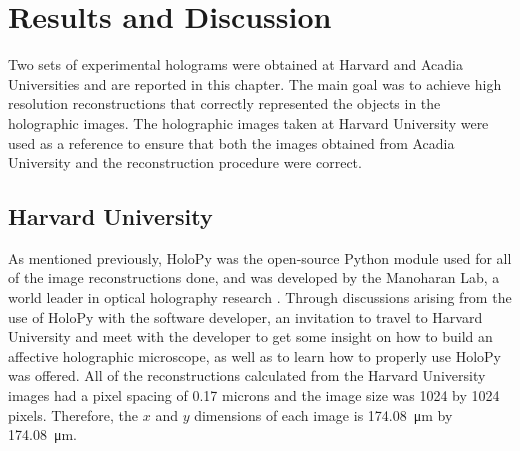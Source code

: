 %
%

\chapter{Results and Discussion} \label{chap:Results}

Two sets of experimental holograms were obtained at Harvard and Acadia
Universities and are reported in this chapter. The main goal was to achieve
high resolution 
reconstructions that correctly represented the objects in the holographic
images.
The holographic images taken at Harvard University were
used as a reference to ensure that both the images obtained from Acadia
University and the reconstruction procedure were correct.

\section{Harvard University}

As mentioned previously, HoloPy was the open-source Python module used for all
of the image reconstructions
done, and was developed by the Manoharan Lab, a world leader in optical
holography research \cite{Manoharan}. 
Through discussions arising from the use of HoloPy with the software developer, 
an invitation to travel to
Harvard University and meet with the developer to get some insight on how to
build an affective holographic microscope, as well as to learn how to properly
use HoloPy was offered.
All of the reconstructions calculated from the Harvard University images had a pixel
spacing of 0.17 microns and the image size was 1024 by 1024 pixels.
Therefore, the $x$ and $y$ dimensions of each image is \SI{174.08}{\micro\meter} by \SI{174.08}{\micro\meter}.
%
%


